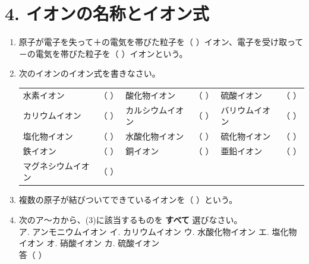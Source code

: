 \section*{4. イオンの名称とイオン式}
\begin{enumerate}
    \item 原子が電子を失って＋の電気を帯びた粒子を（ \hspace{3cm} ）イオン、電子を受け取って－の電気を帯びた粒子を（ \hspace{3cm} ）イオンという。
    \item 次のイオンのイオン式を書きなさい。
    
    \vspace{0.2cm}
    \hspace*{-1.5cm}%
    {\renewcommand{\arraystretch}{1.5}
    \begin{tabular}{llllll}
    水素イオン&（ \hspace{1.5cm} ） & 酸化物イオン&（ \hspace{1.5cm} ） & 硫酸イオン&（ \hspace{1.5cm} ） \\
    カリウムイオン&（ \hspace{1.5cm} ） & カルシウムイオン&（ \hspace{1.5cm} ） & バリウムイオン&（ \hspace{1.5cm} ） \\
    塩化物イオン&（ \hspace{1.5cm} ） & 水酸化物イオン&（ \hspace{1.5cm} ） & 硫化物イオン&（ \hspace{1.5cm} ） \\
    鉄イオン&（ \hspace{1.5cm} ） & 銅イオン&（ \hspace{1.5cm} ） & 亜鉛イオン&（ \hspace{1.5cm} ） \\
    マグネシウムイオン&（ \hspace{1.5cm} ） &&& & \\
    \end{tabular}}
    \vspace{0.2cm}

    \item 複数の原子が結びついてできているイオンを（ \hspace{5cm} ）という。
    \item 次のア～カから、(3)に該当するものを \textbf{すべて} 選びなさい。\\[0.2cm]
    ア. アンモニウムイオン \hspace{0.5cm} イ. カリウムイオン \hspace{0.5cm} ウ. 水酸化物イオン \hspace{0.5cm} エ. 塩化物イオン \hspace{0.5cm} オ. 硝酸イオン \hspace{0.5cm} カ. 硫酸イオン\\[0.2cm]
    答（ \hspace{5cm} ）
\end{enumerate}
